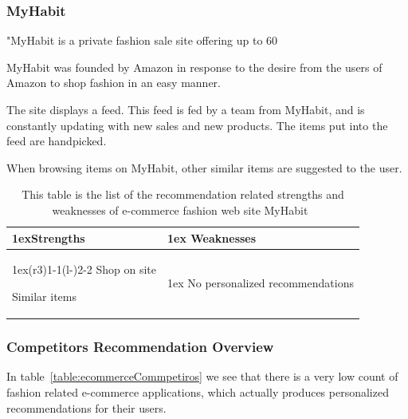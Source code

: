 \subsubsection{MyHabit} %
\label{par:myhabit}
    "MyHabit is a private fashion sale site offering up to 60%

    MyHabit was founded by Amazon in response to the desire from the users of Amazon to shop fashion in an easy manner.

    The site displays a feed.
    This feed is fed by a team from MyHabit, and is constantly updating with new sales and new products.
    The items put into the feed are handpicked.

    When browsing items on MyHabit, other similar items are suggested to the user.
    \begin{table}[H]
                    \centering
                    \begin{tabularx}{\linewidth}{>{\parskip1ex}X@{\kern4\tabcolsep}>{\parskip1ex}X}
                    \toprule
                    \hfil\bfseries Strengths
                    &
                    \hfil\bfseries Weaknesses
                    \\\cmidrule(r{3\tabcolsep}){1-1}\cmidrule(l{-\tabcolsep}){2-2}
                Shop on site \par
                Similar items \par
             &
                No personalized recommendations \par
            \\ \bottomrule
        \end{tabularx}
        \caption[Recommendation related strengths and weaknesses of MyHabit~\cite{MyHabit}]{This table is the list of the recommendation related strengths and weaknesses of e-commerce fashion web site MyHabit~\cite{MyHabit}}
        \label{table:ecommenreceMyHabit}
    \end{table}

\subsubsection{Competitors Recommendation Overview} %
\label{par:competitors_recommendation_overview}
    In table~\ref{table:ecommerceCommpetiros} we see that there is a very low count of fashion related e-commerce applications, which actually produces personalized recommendations for their users.

